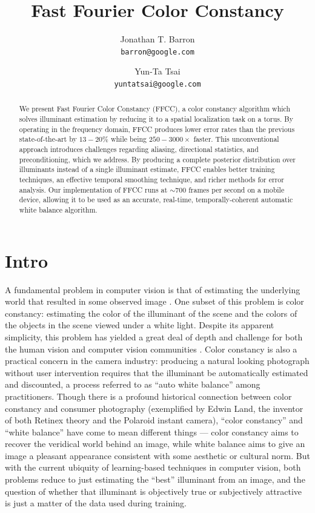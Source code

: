 \documentclass[10pt,twocolumn,letterpaper]{article}
\begin{document}
\title{Fast Fourier Color Constancy}

\author{
Jonathan T. Barron\\
{\tt\small barron@google.com}
\and
Yun-Ta Tsai\\
{\tt\small yuntatsai@google.com}
}
\maketitle

\begin{abstract}
We present Fast Fourier Color Constancy (FFCC), a color constancy algorithm
which solves illuminant estimation by reducing it to a spatial localization
task on a torus.
By operating in the frequency domain,
FFCC produces lower error rates than the previous state-of-the-art by
$13-20\%$ while being $250-3000\times$ faster.
This unconventional approach introduces challenges regarding aliasing,
directional statistics, and preconditioning, which we address.
By producing a complete posterior distribution over illuminants instead of a
single illuminant estimate, FFCC enables better training techniques,
an effective temporal smoothing technique,
and richer methods for error analysis.
Our implementation of FFCC runs at $\sim 700$ frames per second on a mobile
device, allowing it to be used as an accurate,
real-time, temporally-coherent automatic white balance algorithm.
\end{abstract}

\section{Intro}

A fundamental problem in computer vision is that of estimating the underlying
world that resulted in some observed image \cite{Adelson1996, BarrowTenenbaum78}.
One subset of this problem is color constancy:
estimating the color of the illuminant of the scene and the colors of the objects in the
scene viewed under a white light.
Despite its apparent simplicity, this problem has yielded a great deal
of depth and challenge for both the human vision and computer vision communities
\cite{foster2011color, GijsenijTIP2011}.
Color constancy is also a practical concern in the camera industry:
producing a natural looking photograph without user intervention requires that
the illuminant be automatically estimated and discounted, a process referred to as
``auto white balance'' among practitioners.
Though there is a profound historical connection between color constancy and
consumer photography
(exemplified by Edwin Land, the inventor of both Retinex theory
\cite{land1971lightness} and the Polaroid instant camera),
``color constancy'' and ``white balance'' have come to mean different things
--- color constancy aims to recover the veridical world behind an image,
while white balance aims to give an image a pleasant appearance
consistent with some aesthetic or cultural norm.
But with the current ubiquity of learning-based techniques in computer vision,
both problems reduce to just estimating the
``best'' illuminant from an image, and the question of whether that illuminant
is objectively true or subjectively attractive is just a matter of the
data used during training.
\end{document}
